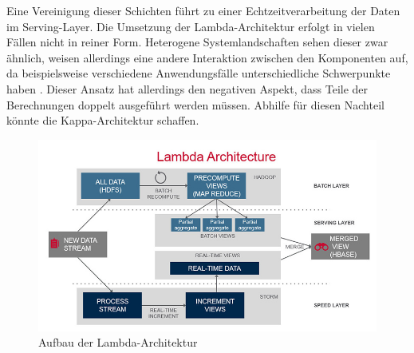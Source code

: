 Eine Vereinigung dieser Schichten führt zu einer Echtzeitverarbeitung der Daten im Serving-Layer. Die Umsetzung der Lambda-Architektur erfolgt in vielen Fällen nicht in reiner Form. Heterogene Systemlandschaften sehen dieser zwar ähnlich, weisen allerdings eine andere Interaktion zwischen den Komponenten auf, da beispielsweise verschiedene Anwendungsfälle unterschiedliche Schwerpunkte haben \cite{Berle.2017}. Dieser Ansatz hat allerdings den negativen Aspekt, dass Teile der Berechnungen doppelt ausgeführt werden müssen. Abhilfe für diesen Nachteil könnte die Kappa-Architektur schaffen.
\begin{figure}[h!]
	\centering
	\includegraphics[width=1.0\linewidth]{images/lambda-architecture}
	\caption{Aufbau der Lambda-Architektur} %
	\label{fig:cnn_structure}
\end{figure}